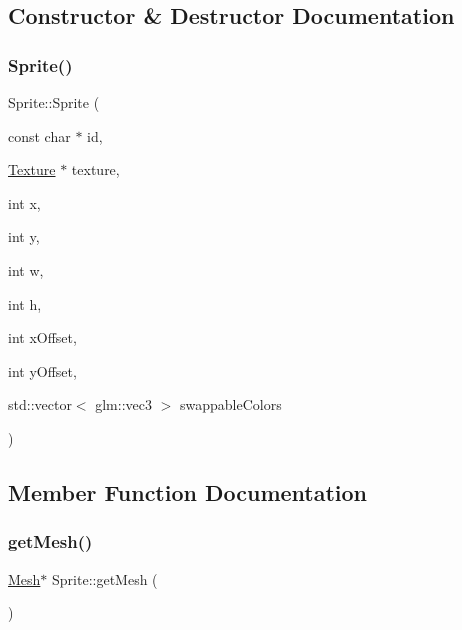 \subsection{Constructor \& Destructor Documentation}
\mbox{\label{class_sprite_ac5f5ecc78c5f7ee7908c5d202d03260e}} 
\subsubsection{\texorpdfstring{Sprite()}{Sprite()}}
{\footnotesize\ttfamily Sprite\+::\+Sprite (\begin{DoxyParamCaption}\item[{const char $\ast$}]{id,  }\item[{\hyperlink{class_texture}{Texture} $\ast$}]{texture,  }\item[{int}]{x,  }\item[{int}]{y,  }\item[{int}]{w,  }\item[{int}]{h,  }\item[{int}]{x\+Offset,  }\item[{int}]{y\+Offset,  }\item[{std\+::vector$<$ glm\+::vec3 $>$}]{swappable\+Colors }\end{DoxyParamCaption})}



\subsection{Member Function Documentation}
\mbox{\label{class_sprite_a79dcf0629aa9ed6c93a55b21dd581770}} 
\subsubsection{\texorpdfstring{get\+Mesh()}{getMesh()}}
{\footnotesize\ttfamily \hyperlink{class_mesh}{Mesh}$\ast$ Sprite\+::get\+Mesh (\begin{DoxyParamCaption}{ }\end{DoxyParamCaption})\hspace{0.3cm}{\ttfamily [inline]}}

\mbox{\label{class_sprite_a4d4631f7a5657981ae92c44da94ecc0a}} 
